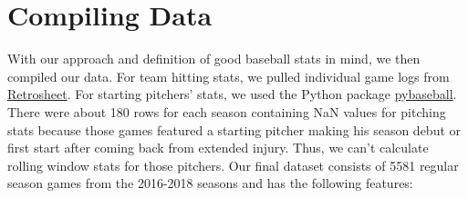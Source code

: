 \documentclass[12pt,onecolumn]{article}
\begin{document}
\section*{Compiling Data}
With our approach and definition of good baseball stats in mind, we then compiled our data. For team hitting stats, we pulled individual game logs from \href{https://www.retrosheet.org/gamelogs/index.html}{Retrosheet}. For starting pitchers' stats, we used the Python package \href{https://github.com/jldbc/pybaseball}{pybaseball}. There were about 180 rows for each season containing NaN values for pitching stats because those games featured a starting pitcher making his season debut or first start after coming back from extended injury. Thus, we can't calculate rolling window stats for those pitchers. Our final dataset consists of 5581 regular season games from the 2016-2018 seasons and has the following features:
\end{document}
